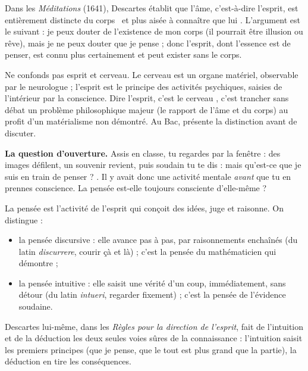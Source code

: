 \documentclass[11pt]{article}
\newcommand{\cle}[1]{{\popxbold\color{popdark}#1}}
\newcounter{popsec}
\newcounter{popsub}
\newcommand{\courssub}[1]{%
  \stepcounter{popsub}%
  \par\vspace{9pt}\noindent{\popxbold\fontsize{11.5}{13}\selectfont\color{popink}{\color{poporange}\thepopsec.\thepopsub}\hspace{6pt}#1}\par\nopagebreak\vspace{4pt}
}
\begin{document}
\begin{propriete}
Dans les \emph{Méditations} (1641), Descartes établit que l'âme, c'est-à-dire l'esprit, est \guillemotleft entièrement distincte du corps \guillemotright\ et \guillemotleft plus aisée à connaître que lui \guillemotright. L'argument est le suivant : je peux douter de l'existence de mon corps (il pourrait être illusion ou rêve), mais je ne peux douter que je pense ; donc l'esprit, dont l'essence est de penser, est connu plus certainement et peut exister sans le corps.
\end{propriete}

\begin{attention}
Ne confonds pas \cle{esprit} et \cle{cerveau}. Le cerveau est un organe matériel, observable par le neurologue ; l'esprit est le principe des activités psychiques, saisies de l'intérieur par la conscience. Dire \guillemotleft l'esprit, c'est le cerveau \guillemotright, c'est trancher sans débat un problème philosophique majeur (le rapport de l'âme et du corps) au profit d'un matérialisme non démontré. Au Bac, présente la distinction avant de discuter.
\end{attention}

\courssub{La pensée : l'activité de l'esprit}

\textbf{La question d'ouverture.} Assis en classe, tu regardes par la fenêtre : des images défilent, un souvenir revient, puis soudain tu te dis : \guillemotleft mais qu'est-ce que je suis en train de penser ? \guillemotright. Il y avait donc une activité mentale \emph{avant} que tu en prennes conscience. La pensée est-elle toujours consciente d'elle-même ?

\begin{definition}[La pensée]
La \cle{pensée} est l'activité de l'esprit qui conçoit des idées, juge et raisonne. On distingue :
\begin{itemize}
\item la pensée \cle{discursive} : elle avance pas à pas, par raisonnements enchaînés (du latin \emph{discurrere}, courir çà et là) ; c'est la pensée du mathématicien qui démontre ;
\item la pensée \cle{intuitive} : elle saisit une vérité d'un coup, immédiatement, sans détour (du latin \emph{intueri}, regarder fixement) ; c'est la pensée de l'évidence soudaine.
\end{itemize}
\end{definition}

Descartes lui-même, dans les \emph{Règles pour la direction de l'esprit}, fait de l'\cle{intuition} et de la \cle{déduction} les deux seules voies sûres de la connaissance : l'intuition saisit les premiers principes (que je pense, que le tout est plus grand que la partie), la déduction en tire les conséquences.
\end{document}

